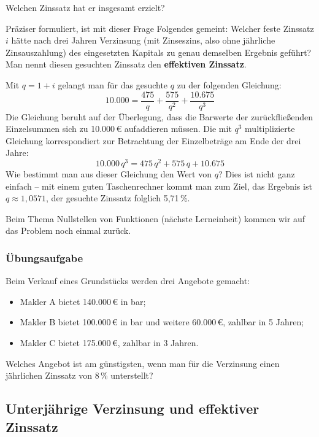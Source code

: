 Welchen Zinssatz hat er insgesamt erzielt?

Präziser formuliert, ist mit dieser Frage Folgendes gemeint: Welcher feste Zinssatz $i$ hätte nach drei Jahren Verzinsung (mit Zinseszins, also ohne jährliche Zinsauszahlung) des eingesetzten Kapitals zu genau demselben Ergebnis geführt? Man nennt diesen gesuchten Zinssatz den \textbf{effektiven Zinssatz}.

Mit $q = 1 + i$ gelangt man für das gesuchte $q$ zu der folgenden Gleichung:
\[ 10.000 = \frac{475}{q} + \frac{575}{q^2} + \frac{10.675}{q^3} \]
Die Gleichung beruht auf der Überlegung, dass die Barwerte der zurückfließenden Einzelsummen sich zu 10.000\,€ aufaddieren müssen. Die mit $q^3$ multiplizierte Gleichung korrespondiert zur Betrachtung der Einzelbeträge am Ende der drei Jahre:
\[ 10.000\,q^3 = 475\,q^2 + 575\,q + 10.675 \]
Wie bestimmt man aus dieser Gleichung den Wert von $q$? Dies ist nicht ganz einfach -- mit einem guten Taschenrechner kommt man zum Ziel, das Ergebnis ist $q \approx 1{,}0571$, der gesuchte Zinssatz folglich 5{,}71\,\%.

Beim Thema Nullstellen von Funktionen (nächste Lerneinheit) kommen wir auf das Problem noch einmal zurück.\beispielende

\subsubsection{Übungsaufgabe}

\begin{graukasten}
  Beim Verkauf eines Grundstücks werden drei Angebote gemacht:
  \begin{itemize}
    \item Makler A bietet 140.000\,€ in bar;
    \item Makler B bietet 100.000\,€ in bar und weitere 60.000\,€, zahlbar in 5 Jahren;
    \item Makler C bietet 175.000\,€, zahlbar in 3 Jahren.
  \end{itemize}
  Welches Angebot ist am günstigsten, wenn man für die Verzinsung einen jährlichen Zinssatz von 8\,\% unterstellt?
\end{graukasten}

\subsection{Unterjährige Verzinsung und effektiver Zinssatz}


